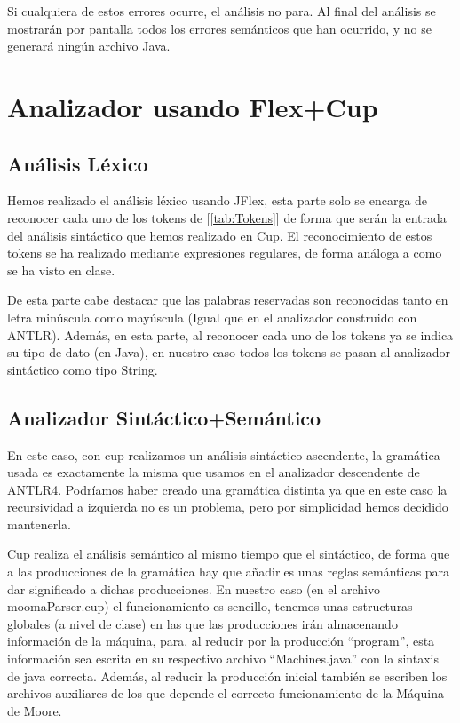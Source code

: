 \documentclass{pre-tfg}
\begin{document}
\vspace{10mm}
Si cualquiera de estos errores ocurre, el análisis no para. Al final del análisis se mostrarán por pantalla todos los errores semánticos que han ocurrido, y no se generará ningún archivo Java.

\section{Analizador usando Flex+Cup}
\subsection{Análisis Léxico}
Hemos realizado el análisis léxico usando JFlex, esta parte solo se encarga de reconocer cada uno de los tokens de [\ref{tab:Tokens}] de forma que serán la entrada del análisis sintáctico que hemos realizado en Cup. El reconocimiento de estos tokens se ha realizado mediante expresiones regulares, de forma análoga a como se ha visto en clase.

De esta parte cabe destacar que las palabras reservadas son reconocidas tanto en letra minúscula como mayúscula (Igual que en el analizador construido con ANTLR). Además, en esta parte, al reconocer cada uno de los tokens ya se indica su tipo de dato (en Java), en nuestro caso todos los tokens se pasan al analizador sintáctico como tipo String.

\subsection{Analizador Sintáctico+Semántico}
En este caso, con cup realizamos un análisis sintáctico ascendente, la gramática usada es exactamente la misma que usamos en el analizador descendente de ANTLR4. Podríamos haber creado una gramática distinta ya que en este caso la recursividad a izquierda no es un problema, pero por simplicidad hemos decidido mantenerla.

Cup realiza el análisis semántico al mismo tiempo que el sintáctico, de forma que a las producciones de la gramática hay que añadirles unas reglas semánticas para dar significado a dichas producciones. En nuestro caso (en el archivo moomaParser.cup) el funcionamiento es sencillo, tenemos unas estructuras globales (a nivel de clase) en las que las producciones irán almacenando información de la máquina, para, al reducir por la producción ``program'', esta información sea escrita en su respectivo archivo ``Machines.java'' con la sintaxis de java correcta. Además, al reducir la producción inicial también se escriben los archivos auxiliares de los que depende el correcto funcionamiento de la Máquina de Moore.
\end{document}
